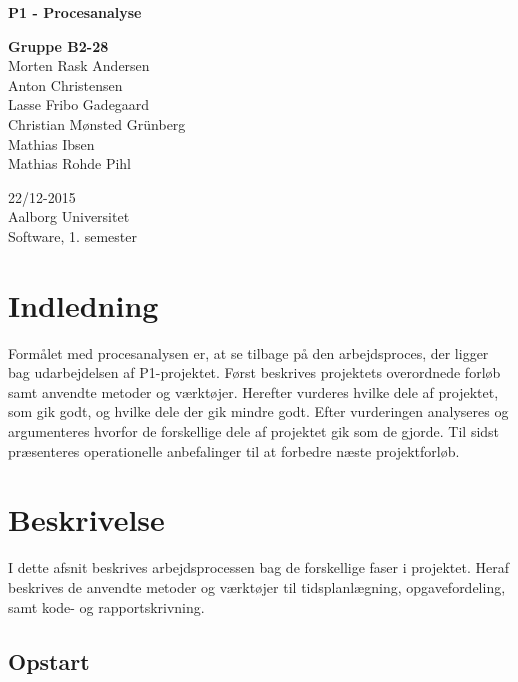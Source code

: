 \documentclass[oneside,a4paper,titlepage]{article}
\begin{document}
\begin{titlepage}
  \vspace{0.2cm}
  \begin{center}
    \Huge{\textbf{P1 - Procesanalyse}}
  \end{center}
  \vspace{0.2cm}
  \begin{center}
    \Large{\textbf{Gruppe B2-28}}\\
    Morten Rask Andersen\\
    Anton Christensen\\
    Lasse Fribo Gadegaard\\
    Christian Mønsted Grünberg\\
    Mathias Ibsen\\
    Mathias Rohde Pihl
  \end{center}
  \begin{center}
    22/12-2015\\
    Aalborg Universitet\\
    Software, 1. semester
  \end{center}
\end{titlepage}





\section{Indledning}

Formålet med procesanalysen er, at se tilbage på den arbejdsproces, der ligger bag udarbejdelsen af P1-projektet. Først beskrives projektets overordnede forløb samt anvendte metoder og værktøjer. Herefter vurderes hvilke dele af projektet, som gik godt, og hvilke dele der gik mindre godt. Efter vurderingen analyseres og argumenteres hvorfor de forskellige dele af projektet gik som de gjorde. Til sidst præsenteres operationelle anbefalinger til at forbedre næste projektforløb. 

\section{Beskrivelse}
\label{sec:beskrivelse}
I dette afsnit beskrives arbejdsprocessen bag de forskellige faser i projektet. Heraf beskrives de anvendte metoder og værktøjer til tidsplanlægning, opgavefordeling, samt kode- og rapportskrivning.

\subsection{Opstart}
\end{document}
